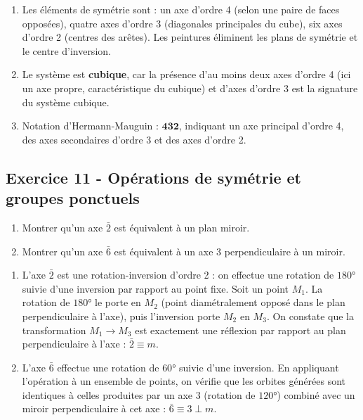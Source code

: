 \documentclass[12pt,a4paper]{article}
\begin{document}
\begin{boitecorrige}
\begin{enumerate}
\item Les éléments de symétrie sont : un axe d'ordre 4 (selon une paire de faces opposées), quatre axes d'ordre 3 (diagonales principales du cube), six axes d'ordre 2 (centres des arêtes). Les peintures éliminent les plans de symétrie et le centre d'inversion.

\item Le système est \textbf{cubique}, car la présence d'au moins deux axes d'ordre 4 (ici un axe propre, caractéristique du cubique) et d'axes d'ordre 3 est la signature du système cubique.

\item Notation d'Hermann-Mauguin : $\mathbf{432}$, indiquant un axe principal d'ordre 4, des axes secondaires d'ordre 3 et des axes d'ordre 2.
\end{enumerate}
\end{boitecorrige}

\subsection*{Exercice 11 - Opérations de symétrie et groupes ponctuels \niveau{\difficile}}

\begin{boiteexercice}
\niveau{\difficile}
\begin{enumerate}
  \item Montrer qu'un axe $\bar{2}$ est équivalent à un plan miroir.
  \item Montrer qu'un axe $\bar{6}$ est équivalent à un axe $3$ perpendiculaire à un miroir.
\end{enumerate}
\end{boiteexercice}

\begin{boitecorrige}
\begin{enumerate}
\item L'axe $\bar{2}$ est une rotation-inversion d'ordre 2 : on effectue une rotation de $180°$ suivie d'une inversion par rapport au point fixe. Soit un point $M_1$. La rotation de $180°$ le porte en $M_2$ (point diamétralement opposé dans le plan perpendiculaire à l'axe), puis l'inversion porte $M_2$ en $M_3$. On constate que la transformation $M_1\to M_3$ est exactement une réflexion par rapport au plan perpendiculaire à l'axe : $\bar{2} \equiv m$.

\item L'axe $\bar{6}$ effectue une rotation de $60°$ suivie d'une inversion. En appliquant l'opération à un ensemble de points, on vérifie que les orbites générées sont identiques à celles produites par un axe 3 (rotation de $120°$) combiné avec un miroir perpendiculaire à cet axe : $\bar{6} \equiv 3\perp m$.
\end{enumerate}
\end{boitecorrige}
\end{document}
